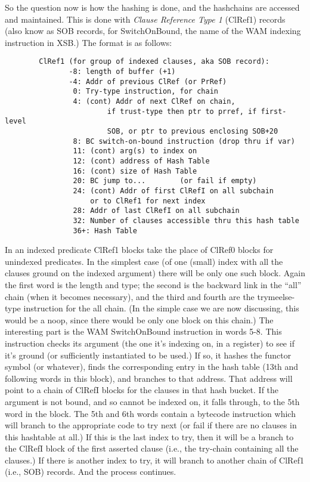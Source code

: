 \documentclass[11pt]{article}
\begin{document}
So the question now is how the hashing is done, and the hashchains are
accessed and maintained.  This is done with {\em Clause Reference Type
1} (ClRef1) records (also know as SOB records, for SwitchOnBound, the
name of the WAM indexing instruction in XSB.)  The format is as
follows:
\begin{verbatim}
        ClRef1 (for group of indexed clauses, aka SOB record):
               -8: length of buffer (+1)
               -4: Addr of previous ClRef (or PrRef)
                0: Try-type instruction, for chain
                4: (cont) Addr of next ClRef on chain,
                        if trust-type then ptr to prref, if first-level
                        SOB, or ptr to previous enclosing SOB+20  
                8: BC switch-on-bound instruction (drop thru if var)
                11: (cont) arg(s) to index on
                12: (cont) address of Hash Table
                16: (cont) size of Hash Table
                20: BC jump to...        (or fail if empty)
                24: (cont) Addr of first ClRefI on all subchain
                    or to ClRef1 for next index
                28: Addr of last ClRefI on all subchain
                32: Number of clauses accessible thru this hash table
                36+: Hash Table
\end{verbatim}

In an indexed predicate ClRef1 blocks take the place of ClRef0 blocks
for unindexed predicates.  In the simplest case (of one (small) index
with all the clauses ground on the indexed argument) there will be
only one such block.  Again the first word is the length and type; the
second is the backward link in the ``all'' chain (when it becomes
necessary), and the third and fourth are the trymeelse-type
instruction for the all chain.  (In the simple case we are now
discussing, this would be a noop, since there would be only one block
on this chain.)  The interesting part is the WAM SwitchOnBound
instruction in words 5-8.  This instruction checks its argument (the
one it's indexing on, in a register) to see if it's ground (or
sufficiently instantiated to be used.)  If so, it hashes the functor
symbol (or whatever), finds the corresponding entry in the hash table
(13th and following words in this block), and branches to that
address.  That address will point to a chain of ClRefI blocks for the
clauses in that hash bucket.  If the argument is not bound, and so
cannot be indexed on, it falls through, to the 5th word in the block.
The 5th and 6th words contain a bytecode instruction which will branch
to the appropriate code to try next (or fail if there are no clauses
in this hashtable at all.)  If this is the last index to try, then it
will be a branch to the ClRefI block of the first asserted clause
(i.e., the try-chain containing all the clauses.)  If there is another
index to try, it will branch to another chain of ClRef1 (i.e., SOB)
records.  And the process continues.
\end{document}
